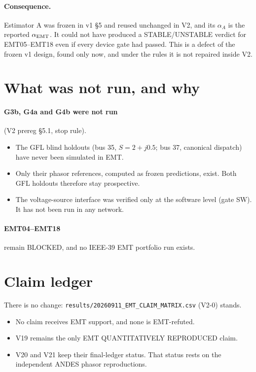 \documentclass[10pt,a4paper]{article}
\newcommand{\f}[1]{\nolinkurl{#1}}
\begin{document}
\paragraph{Consequence.} Estimator A was frozen in v1 \S5 and reused unchanged in
V2, and its $\alpha_A$ is the reported $\alpha_{\rm EMT}$. It could not have
produced a STABLE/UNSTABLE verdict for EMT05--EMT18 even if every device gate had
passed. This is a defect of the frozen v1 design, found only now, and under the
rules it is not repaired inside V2.

\section{What was not run, and why}

\paragraph{G3b, G4a and G4b were not run} (V2 prereg \S5.1, stop rule).
\begin{itemize}
\item The GFL blind holdouts (bus 35, $S=2+j0.5$; bus 37, canonical dispatch)
  have never been simulated in EMT.
\item Only their phasor references, computed as frozen predictions, exist. Both
  GFL holdouts therefore stay prospective.
\item The voltage-source interface was verified only at the software level (gate
  SW). It has not been run in any network.
\end{itemize}

\paragraph{EMT04--EMT18} remain BLOCKED, and no IEEE-39 EMT portfolio run exists.

\section{Claim ledger}

There is no change: \f{results/20260911_EMT_CLAIM_MATRIX.csv} (V2-0) stands.
\begin{itemize}
\item No claim receives EMT support, and none is EMT-refuted.
\item V19 remains the only EMT QUANTITATIVELY REPRODUCED claim.
\item V20 and V21 keep their final-ledger status. That status rests on the
  independent ANDES phasor reproductions.
\end{itemize}
\end{document}
